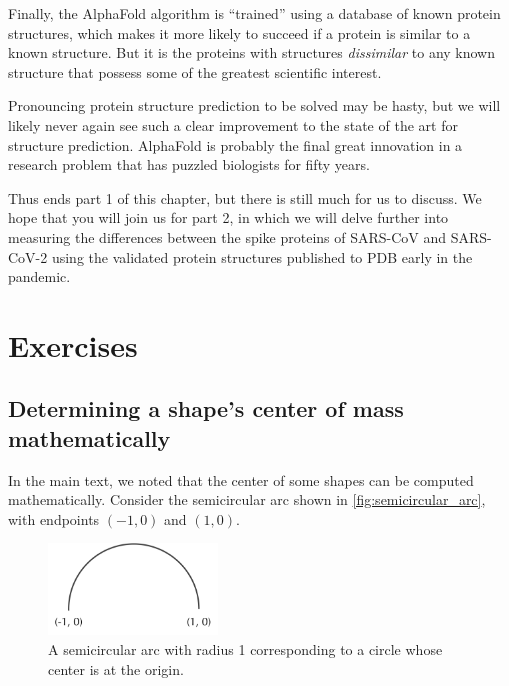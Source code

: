 Finally, the AlphaFold algorithm is ``trained'' using a database of known protein structures, which makes it more likely to succeed if a protein is similar to a known structure. But it is the proteins with structures \textit{dissimilar} to any known structure that possess some of the greatest scientific interest.

Pronouncing protein structure prediction to be solved may be hasty, but we will likely never again see such a clear improvement to the state of the art for structure prediction. AlphaFold is probably the final great innovation in a research problem that has puzzled biologists for fifty years.

Thus ends part 1 of this chapter, but there is still much for us to discuss. We hope that you will join us for part 2, in which we will delve further into measuring the differences between the spike proteins of SARS-CoV and SARS-CoV-2 using the validated protein structures published to PDB early in the pandemic.\\

\newpage

\FloatBarrier
{}

\section{Exercises}

\subsection{Determining a shape's center of mass mathematically}

In the main text, we noted that the center of some shapes can be computed mathematically. Consider the semicircular arc shown in \autoref{fig:semicircular_arc}, with endpoints $(-1, 0)$ and $(1, 0)$.\\


\begin{figure}[h]
	\centering
	\mySfFamily
	\includegraphics[width = 0.4\textwidth]{../images/semicircular_arc.png}
	\caption{A semicircular arc with radius 1 corresponding to a circle whose center is at the origin.}
	\label{fig:semicircular_arc}
\end{figure}

